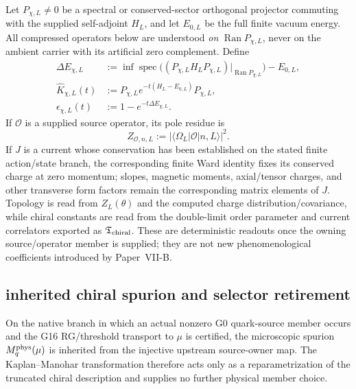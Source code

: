 \documentclass[12pt,a4paper]{article}
\begin{document}
\begin{definition}
Let \(P_{\chi,L}\ne0\) be a spectral or conserved-sector orthogonal projector commuting with the supplied self-adjoint \(H_L\), and let \(E_{0,L}\) be the full finite vacuum energy. All compressed operators below are understood \emph{on} \(\operatorname{Ran}P_{\chi,L}\), never on the ambient carrier with its artificial zero complement. Define
\begin{align}
\Delta E_{\chi,L}&:=\inf\operatorname{spec}\bigl((P_{\chi,L}H_LP_{\chi,L})|_{\operatorname{Ran}P_{\chi,L}}\bigr)-E_{0,L},\\
\widehat K_{\chi,L}(t)&:=P_{\chi,L}e^{-t(H_L-E_{0,L})}P_{\chi,L},\\
\epsilon_{\chi,L}(t)&:=1-e^{-t\Delta E_{\chi,L}}.
\end{align}
If \(\mathcal O\) is a supplied source operator, its pole residue is
\[
Z_{\mathcal O,n,L}:=|\langle\Omega_L|\mathcal O|n,L\rangle|^2.
\]
If \(J\) is a current whose conservation has been established on the stated finite action/state branch, the corresponding finite Ward identity fixes its conserved charge at zero momentum; slopes, magnetic moments, axial/tensor charges, and other transverse form factors remain the corresponding matrix elements of \(J\).  Topology is read from \(Z_L(\theta)\) and the computed charge distribution/covariance, while chiral constants are read from the double-limit order parameter and current correlators exported as \(\mathfrak T_{\rm chiral}\).  These are deterministic readouts once the owning source/operator member is supplied; they are not new phenomenological coefficients introduced by Paper~VII-B.
\end{definition}


\subsection{inherited chiral spurion and selector retirement}
\label{p11:sec:v154-inherited-chiral-spurion}

\begin{corollary}
\label{p11:cor:v154-km-selector-retired}
On the native branch in which an actual nonzero G0 quark-source member occurs
and the G16 RG/threshold transport to \(\mu\) is certified, the microscopic
spurion \(M_q^{\rm phys}(\mu)\) is inherited from the injective upstream
source-owner map.  The Kaplan--Manohar transformation therefore acts only as a
reparametrization of the truncated chiral description and supplies no further
physical member choice.
\end{corollary}
\end{document}
